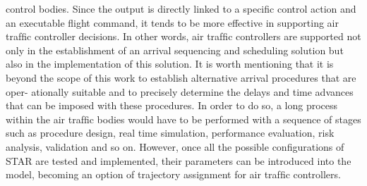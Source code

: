 \documentclass{aer1315-pretty}
\begin{document}
\begin{itemize}
control bodies. Since the output is directly linked to a speciﬁc control action and an executable ﬂight command, it tends to be
more effective in supporting air trafﬁc controller decisions. In other words, air trafﬁc controllers are supported not only in
the establishment of an arrival sequencing and scheduling solution but also in the implementation of this solution.
    It is worth mentioning that it is beyond the scope of this work to establish alternative arrival procedures that are oper-
ationally suitable and to precisely determine the delays and time advances that can be imposed with these procedures. In
order to do so, a long process within the air trafﬁc bodies would have to be performed with a sequence of stages such as
procedure design, real time simulation, performance evaluation, risk analysis, validation and so on. However, once all the
possible conﬁgurations of STAR are tested and implemented, their parameters can be introduced into the model, becoming
an option of trajectory assignment for air trafﬁc controllers.




\end{itemize}
\end{document}

